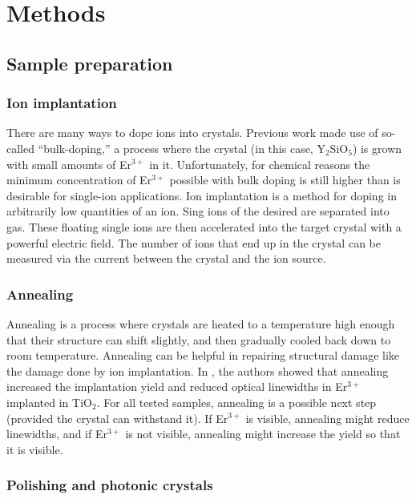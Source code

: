 \documentclass[12pt]{report}
\newcommand{\erbium}[1][ ]{Er$^{3+}$#1}
\newcommand{\YSO}[1][ ]{Y$_{2}$SiO$_{5}$#1}
\newcommand{\TiO}[1][ ]{TiO$_{2}$#1}
\begin{document}


\chapter{Methods}

\section{Sample preparation}
\label{sec:sample-preparation}

\subsection{Ion implantation}
\label{sec:ion-implantation}

There are many ways to dope ions into crystals. Previous work made use of so-called ``bulk-doping,'' a process where the crystal (in this case, \YSO[]) is grown with small amounts of \erbium in it. Unfortunately, for chemical reasons the minimum concentration of \erbium possible with bulk doping is still higher than is desirable for single-ion applications. Ion implantation is a method for doping in arbitrarily low quantities of an ion. Sing ions of the desired are separated into gas. These floating single ions are then accelerated into the target crystal with a powerful electric field. The number of ions that end up in the crystal can be measured via the current between the crystal and the ion source. 

\subsection{Annealing}
\label{sec:annealing}

Annealing is a process where crystals are heated to a temperature high enough that their structure can shift slightly, and then gradually cooled back down to room temperature. Annealing can be helpful in repairing structural damage like the damage done by ion implantation. In \cite{Phenicie2019}, the authors showed that annealing increased the implantation yield and reduced optical linewidths in \erbium implanted in \TiO[.] For all tested samples, annealing is a possible next step (provided the crystal can withstand it). If \erbium is visible, annealing might reduce linewidths, and if \erbium is not visible, annealing might increase the yield so that it is visible. 

\subsection{Polishing and photonic crystals}
\label{sec:polishing}
\end{document}

